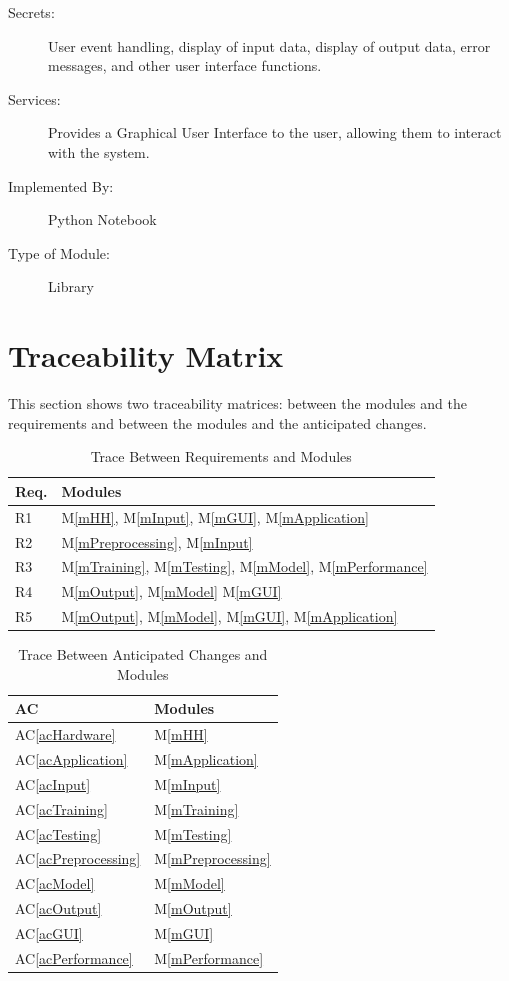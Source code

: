 \documentclass[12pt, titlepage]{article}
\newcommand{\acref}[1]{AC\ref{#1}}
\newcommand{\mref}[1]{M\ref{#1}}
\begin{document}
\begin{description}
\item[Secrets:] User event handling, display of input data, display of output
data, error messages, and other user interface functions.
\item[Services:] Provides a Graphical User Interface to the user, allowing them
to interact with the system.
\item[Implemented By:] Python Notebook
\item[Type of Module:] Library
\end{description}

\section{Traceability Matrix} \label{SecTM}

This section shows two traceability matrices: between the modules and the
requirements and between the modules and the anticipated changes.

\begin{table}[H]
\centering
\begin{tabular}{p{} p{}}
\toprule
\textbf{Req.} & \textbf{Modules}\\
\midrule
R1 & \mref{mHH}, \mref{mInput}, \mref{mGUI}, \mref{mApplication}\\
R2 & \mref{mPreprocessing}, \mref{mInput}\\
R3 & \mref{mTraining}, \mref{mTesting}, \mref{mModel}, \mref{mPerformance}\\
R4 & \mref{mOutput}, \mref{mModel} \mref{mGUI}\\
R5 & \mref{mOutput}, \mref{mModel}, \mref{mGUI}, \mref{mApplication}\\
\bottomrule
\end{tabular}
\caption{Trace Between Requirements and Modules}
\label{TblRT}
\end{table}

\begin{table}[H]
\centering
\begin{tabular}{p{} p{}}
\toprule
\textbf{AC} & \textbf{Modules}\\
\midrule
\acref{acHardware} & \mref{mHH}\\
\acref{acApplication} & \mref{mApplication}\\
\acref{acInput} & \mref{mInput}\\
\acref{acTraining} & \mref{mTraining}\\
\acref{acTesting} & \mref{mTesting}\\
\acref{acPreprocessing} & \mref{mPreprocessing}\\
\acref{acModel} & \mref{mModel}\\
\acref{acOutput} & \mref{mOutput}\\
\acref{acGUI} & \mref{mGUI}\\
\acref{acPerformance} & \mref{mPerformance}\\
\bottomrule
\end{tabular}
\caption{Trace Between Anticipated Changes and Modules}
\label{TblACT}
\end{table}
\end{document}
